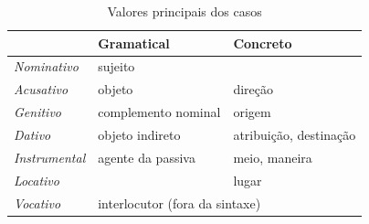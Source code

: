 
\begin{table}[!htb]
	\caption{Valores principais dos casos}\label{tab:valor_dos_casos}
	\begin{center}
		\begin{tabular}[c]{lll}
			\toprule
			                                   & Gramatical                                         & Concreto               \\
			\midrule
			\emph{Nominativo}                  & sujeito                                            &                        \\
			\rowcolor{gray!10}\emph{Acusativo} & objeto                                             & direção                \\
			\emph{Genitivo}                    & complemento nominal                                & origem                 \\
			\rowcolor{gray!10}\emph{Dativo}    & objeto indireto                                    & atribuição, destinação \\
			\emph{Instrumental}                & agente da passiva                                  & meio, maneira          \\
			\rowcolor{gray!10}\emph{Locativo}  &                                                    & lugar                  \\
			\midrule
			\emph{Vocativo}                    & \multicolumn{2}{l}{interlocutor (fora da sintaxe)}                          \\
			\bottomrule
		\end{tabular}
	\end{center}
\end{table}
